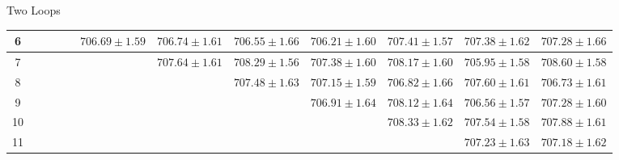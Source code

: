 \documentclass[hyphens,aspectratio=169]{beamer}
\begin{document}
\begin{frame}[fragile]{Two Loops}
\begin{table}[H]
\begin{adjustbox}{max width=\textwidth}
\begin{tabular}{|c|c|c|c|c|c|c|c|c|c|c|c|}
				\hline
				6                 &                   &                   &                   &                   & $706.69 \pm 1.59$ & $706.74 \pm 1.61$ & $706.55 \pm
				1.66$             & $706.21 \pm 1.60$ & $707.41 \pm 1.57$ & $707.38 \pm
				1.62$             & $707.28 \pm 1.66$                                                                                                                                                                                                         \\
				\hline
				7                 &                   &                   &                   &                   &                   & $707.64 \pm 1.61$ & $708.29 \pm 1.56$ & $707.38
				\pm 1.60$         & $708.17 \pm 1.60$ & $705.95 \pm 1.58$ & $708.60 \pm 1.58$                                                                                                                                                                 \\
				\hline
				8                 &                   &                   &                   &                   &                   &                   & $707.48 \pm 1.63$ & $707.15 \pm 1.59$ & $706.82
				\pm 1.66$         & $707.60 \pm 1.61$ & $706.73 \pm 1.61$                                                                                                                                                                                     \\
				\hline
				9                 &                   &                   &                   &                   &                   &                   &                   & $706.91 \pm 1.64$ & $708.12 \pm 1.64$ &
				$706.56 \pm 1.57$ & $707.28 \pm 1.60$                                                                                                                                                                                                         \\
				\hline
				10                &                   &                   &                   &                   &                   &                   &                   &                   & $708.33 \pm 1.62$ & $707.54 \pm 1.58$ &
				$707.88 \pm 1.61$                                                                                                                                                                                                                             \\
				\hline
				11                &                   &                   &                   &                   &                   &                   &                   &                   &                   & $707.23 \pm 1.63$ & $707.18 \pm 1.62$ \\

\end{tabular}
\end{adjustbox}
\end{table}
\end{frame}
\end{document}
